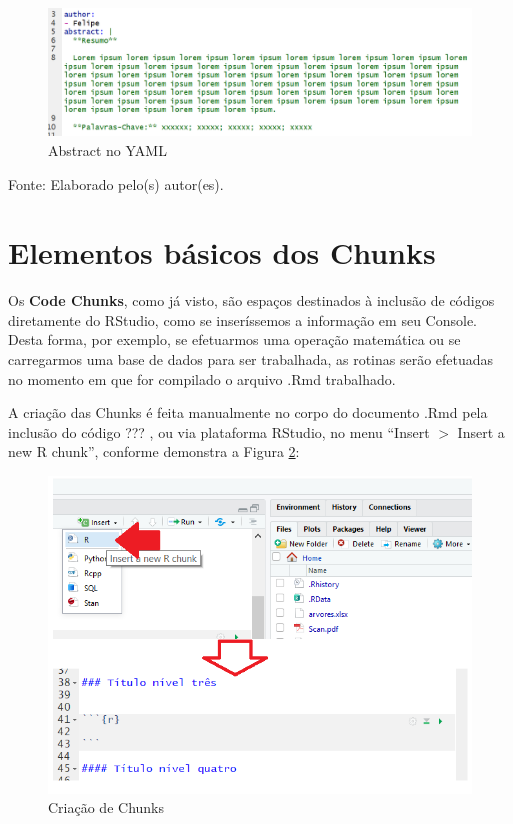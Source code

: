 \documentclass[12pt,brazil,oneside]{book}
\begin{document}
\begin{figure}[H]

{\centering \includegraphics[width=0.6\linewidth]{abstract} 

}

\caption{Abstract no YAML}\label{fig:abstract}
\end{figure}

Fonte: Elaborado pelo(s) autor(es).

\hypertarget{elementos-basicos-dos-chunks}{%
\section{Elementos básicos dos
Chunks}\label{elementos-basicos-dos-chunks}}

Os \textbf{Code Chunks}, como já visto, são espaços destinados à
inclusão de códigos diretamente do RStudio, como se inseríssemos a
informação em seu Console. Desta forma, por exemplo, se efetuarmos uma
operação matemática ou se carregarmos uma base de dados para ser
trabalhada, as rotinas serão efetuadas no momento em que for compilado o
arquivo .Rmd trabalhado.

A criação das Chunks é feita manualmente no corpo do documento .Rmd pela
inclusão do código ??? , ou via plataforma RStudio, no menu ``Insert
\(>\) Insert a new R chunk'', conforme demonstra a Figura
\ref{fig:rmarkchunk1}:

\begin{figure}[H]

{\centering \includegraphics[width=0.6\linewidth]{rmarkchunk1} 

}

\caption{Criação de Chunks}\label{fig:rmarkchunk1}
\end{figure}
\end{document}
